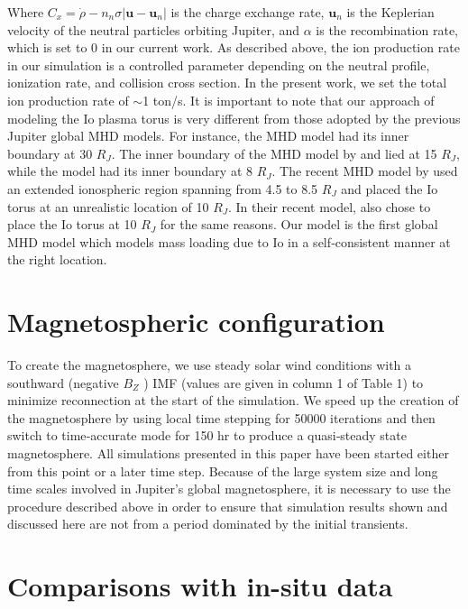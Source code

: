 Where $C_x = \dot{\rho} - n_n \sigma \left|\mathbf{u} - \mathbf{u}_n\right|$ is the charge exchange rate, $\mathbf{u}_n$ is the Keplerian velocity of the neutral particles orbiting Jupiter, and $\alpha$ is the recombination rate, which is set to 0 in our current work. As described above, the ion production rate in our simulation is a controlled parameter depending on the neutral profile, ionization rate, and collision cross section. In the present work, we set the total ion production rate of $\sim$1 ton/s. It is important to note that our approach of modeling the Io plasma torus is very different from those adopted by the previous Jupiter global MHD models. For instance, the  MHD model had its inner boundary at 30 $R_J$. The inner boundary of the MHD model by  and  lied at 15 $R_J$, while the  model had its inner boundary at 8 $R_J$. The recent MHD model by  used an extended ionospheric region spanning from 4.5 to 8.5 $R_J$ and placed the Io torus at an unrealistic location of 10 $R_J$. In their recent model,  also chose to place the Io torus at 10 $R_J$ for the same reasons. Our model is the first global MHD model which models mass loading due to Io in a self‐consistent manner at the right location.

\section{Magnetospheric configuration}
To create the magnetosphere, we use steady solar wind conditions with a southward (negative $B_Z$ ) IMF (values are given in column 1 of Table 1) to minimize reconnection at the start of the simulation. We speed up the creation of the magnetosphere by using local time stepping \cite{Toth2012a} for 50000 iterations and then switch to time‐accurate mode for 150 hr to produce a quasi‐steady state magnetosphere. All simulations presented in this paper have been started either from this point or a later time step. Because of the large system size and long time scales involved in Jupiter's global magnetosphere, it is necessary to use the procedure described above in order to ensure that simulation results shown and discussed here are not from a period dominated by the initial transients.


\section{Comparisons with in-situ data}

